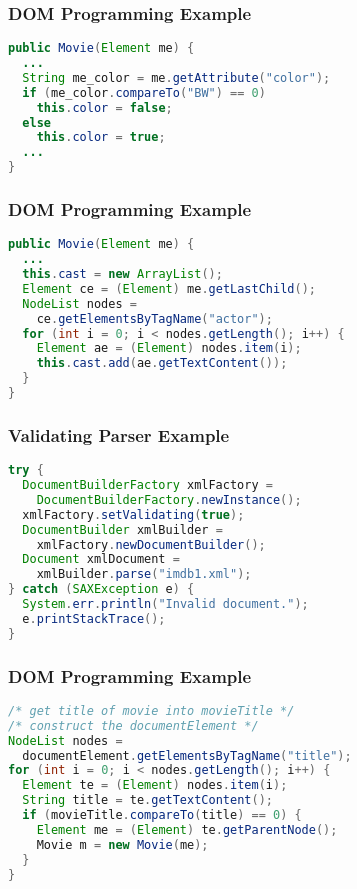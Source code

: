 \documentclass[dvipsnames]{beamer}
\theoremstyle{plain}
\begin{document}
\begin{frame}[fragile]
  \frametitle{DOM Programming Example}

  \begin{example}
    \begin{lstlisting}[language=Java]
public Movie(Element me) {
  ...
  String me_color = me.getAttribute("color");
  if (me_color.compareTo("BW") == 0)
    this.color = false;
  else
    this.color = true;
  ...
}
    \end{lstlisting}
  \end{example}
\end{frame}

\begin{frame}[fragile]
  \frametitle{DOM Programming Example}

  \begin{example}
    \begin{lstlisting}[language=Java]
public Movie(Element me) {
  ...
  this.cast = new ArrayList();
  Element ce = (Element) me.getLastChild();
  NodeList nodes =
    ce.getElementsByTagName("actor");
  for (int i = 0; i < nodes.getLength(); i++) {
    Element ae = (Element) nodes.item(i);
    this.cast.add(ae.getTextContent());
  }
}
    \end{lstlisting}
  \end{example}
\end{frame}

\begin{frame}[fragile]
  \frametitle{Validating Parser Example}

  \begin{example}
    \begin{lstlisting}[language=Java]
try {
  DocumentBuilderFactory xmlFactory =
    DocumentBuilderFactory.newInstance();
  xmlFactory.setValidating(true);
  DocumentBuilder xmlBuilder =
    xmlFactory.newDocumentBuilder();
  Document xmlDocument =
    xmlBuilder.parse("imdb1.xml");
} catch (SAXException e) {
  System.err.println("Invalid document.");
  e.printStackTrace();
}
    \end{lstlisting}
  \end{example}
\end{frame}

\begin{frame}[fragile]
  \frametitle{DOM Programming Example}

  \begin{example}
    \begin{lstlisting}[language=Java]
/* get title of movie into movieTitle */
/* construct the documentElement */
NodeList nodes =
  documentElement.getElementsByTagName("title");
for (int i = 0; i < nodes.getLength(); i++) {
  Element te = (Element) nodes.item(i);
  String title = te.getTextContent();
  if (movieTitle.compareTo(title) == 0) {
    Element me = (Element) te.getParentNode();
    Movie m = new Movie(me);
  }
}
    \end{lstlisting}
  \end{example}
\end{frame}
\end{document}
